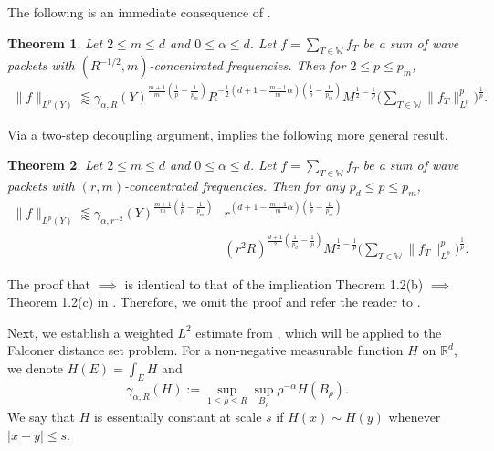 \documentclass[11pt]{amsart}
\newtheorem{theorem}{Theorem}[section]
\theoremstyle{definition}
\theoremstyle{remark}
\numberwithin{equation}{section}
\newcommand{\R}{\mathbb{R}}
\newcommand{\W}{\mathbb{W}}
\newcommand{\less}{\lessapprox}
\begin{document}
The following is an immediate consequence of .
\begin{theorem}\label{thm:LpWeightedDecoupling}
	Let $2\leq m \leq d$  and $0\leq \alpha \leq d$. Let $f = \sum_{T \in \W} f_T$ be a sum of wave packets with $(R^{-1/2}, m)$-concentrated frequencies. Then for $2\leq p \leq p_m$, 
	\begin{align*}
		\| f \|_{L^p(Y)} \less \gamma_{\alpha,R}(Y)^{\frac{m+1}{m}(\frac{1}{p}-\frac{1}{p_m})} R^{-\frac{1}{2} ( d+1 -  \frac{m+1}{m} \alpha)(\frac{1}{p}-\frac{1}{p_m})} 
		M^{\frac{1}{2}-\frac{1}{p}}   \bigg( \sum_{T\in \W} \| f_T \|_{L^p}^p \bigg)^{\frac{1}{p}}.
	\end{align*}
\end{theorem}

Via a two-step decoupling argument,  implies the following more general result. 
\begin{theorem}\label{thm:linearWeightedDecoupling}
	Let $2\leq m \leq d$ and $0\leq \alpha \leq d$. Let $f = \sum_{T \in \W} f_T$ be a sum of wave packets with $(r, m)$-concentrated frequencies. Then for any $p_d\leq p\leq p_m$, 
	\begin{align*}
		\| f\|_{L^p(Y)} \less \gamma_{\alpha,r^{-2}}(Y)^{\frac{m+1}{m}(\frac{1}{p}-\frac{1}{p_m})} &r^{(d+1 - \frac{m+1}{m}\alpha)(\frac{1}{p}-\frac{1}{p_m})} \\ &(r^2 R)^{\frac{d+1}{2}(\frac{1}{p_d} -\frac{1}{p})}  
	M^{\frac{1}{2}-\frac{1}{p}}   \bigg( \sum_{T\in \W} \| f_T \|_{L^p}^p \bigg)^{\frac{1}{p}}. 
	\end{align*}
\end{theorem}

The proof that  $\implies$  is identical to that of the implication  Theorem 1.2(b) $\implies$  Theorem 1.2(c) in \cite{du2023weighted}. Therefore, we omit the proof and refer the reader to \cite{du2023weighted}.

Next, we establish a weighted  $L^2$ estimate from , which will be applied to the Falconer distance set problem. For a non-negative measurable function $H$ on $\R^d$, we denote $H(E) = \int_E H$ and 
\[ \gamma_{\alpha,R}(H) :=   \sup_{1\leq \rho \leq R} \sup_{B_\rho} \rho^{-\alpha} H(B_\rho).\]
We say that $H$ is essentially constant at scale $s$ if $H(x) \sim H(y)$ whenever $|x-y|\leq s$. 
\end{document}
